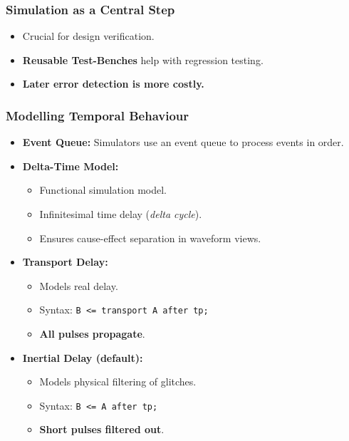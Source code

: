 \subsubsection{Simulation as a Central Step}
\begin{itemize}[leftmargin=1.5em]
    \item Crucial for design verification.
    \item \textbf{Reusable Test-Benches} help with regression testing.
    \item \textbf{Later error detection is more costly.}
\end{itemize}

\subsubsection{Modelling Temporal Behaviour}
\begin{itemize}[leftmargin=1.5em]
    \item \textbf{Event Queue:} Simulators use an event queue to process events in order.
    \item \textbf{Delta-Time Model:}
    \begin{itemize}
        \item Functional simulation model.
        \item Infinitesimal time delay (\textit{delta cycle}).
        \item Ensures cause-effect separation in waveform views.
    \end{itemize}
    \item \textbf{Transport Delay:}
    \begin{itemize}
        \item Models real delay.
        \item Syntax: \verb|B <= transport A after tp;|
        \item \textbf{All pulses propagate}.
    \end{itemize}
    \item \textbf{Inertial Delay (default):}
    \begin{itemize}
        \item Models physical filtering of glitches.
        \item Syntax: \verb|B <= A after tp;|
        \item \textbf{Short pulses filtered out}.
    \end{itemize}
\end{itemize}


